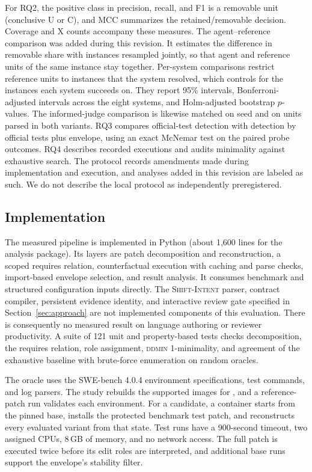 \documentclass[a4paper,fleqn]{cas-sc}
\newcommand{\dsl}{\textsc{Shift-Intent}}
\newcommand{\code}[1]{\texttt{\detokenize{#1}}}
\newcommand{\lab}[1]{\textsf{#1}}
\begin{document}
For RQ2, the positive class in precision, recall, and F1 is a removable unit (conclusive \lab{U} or \lab{C}), and MCC summarizes the retained/removable decision. Coverage and \lab{X} counts accompany these measures. The agent--reference comparison was added during this revision. It estimates the difference in removable share with instances resampled jointly, so that agent and reference units of the same instance stay together. Per-system comparisons restrict reference units to instances that the system resolved, which controls for the instances each system succeeds on. They report 95\% intervals, Bonferroni-adjusted intervals across the eight systems, and Holm-adjusted bootstrap $p$-values. The informed-judge comparison is likewise matched on seed and on units parsed in both variants. RQ3 compares official-test detection with detection by official tests plus envelope, using an exact McNemar test on the paired probe outcomes. RQ4 describes recorded executions and audits minimality against exhaustive search. The protocol records amendments made during implementation and execution, and analyses added in this revision are labeled as such. We do not describe the local protocol as independently preregistered.

\subsection{Implementation}\label{sec:implementation}

The measured pipeline is implemented in Python (about 1,600 lines for the analysis package). Its layers are patch decomposition and reconstruction, a scoped requires relation, counterfactual execution with caching and parse checks, import-based envelope selection, and result analysis. It consumes benchmark and structured configuration inputs directly. The \dsl{} parser, contract compiler, persistent evidence identity, and interactive review gate specified in Section~\ref{sec:approach} are not implemented components of this evaluation. There is consequently no measured result on language authoring or reviewer productivity. A suite of 121 unit and property-based tests checks decomposition, the requires relation, role assignment, \textsc{ddmin} 1-minimality, and agreement of the exhaustive baseline with brute-force enumeration on random oracles.

The oracle uses the SWE-bench 4.0.4 environment specifications, test commands, and log parsers. The study rebuilds the supported images for \code{linux/arm64}, and a reference-patch run validates each environment. For a candidate, a container starts from the pinned base, installs the protected benchmark test patch, and reconstructs every evaluated variant from that state. Test runs have a 900-second timeout, two assigned CPUs, 8\,GB of memory, and no network access. The full patch is executed twice before its edit roles are interpreted, and additional base runs support the envelope's stability filter.
\end{document}
